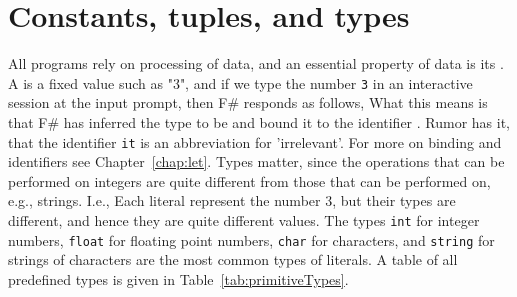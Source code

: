 \chapter{Constants, tuples, and types}
All programs rely on processing of data, and an essential property of data is its . A  is a fixed value such as "3", and if we type the number \lstinline!3! in an interactive session at the input prompt, then F\# responds as follows,
%
%
What this means is that F\# has inferred the type to be  and bound it to the identifier . Rumor has it, that the identifier \lstinline|it| is an abbreviation for 'irrelevant'. For more on binding and identifiers see Chapter~\ref{chap:let}. Types matter, since the operations that can be performed on integers are quite different from those that can be performed on, e.g., strings. I.e.,
%
%
Each literal represent the number 3, but their types are different, and hence they are quite different values. The types \lstinline!int! for integer numbers, \lstinline!float! for floating point numbers, \lstinline!char! for characters, and \lstinline!string! for strings of characters are the most common types of literals. A table of all predefined types is given in Table~\ref{tab:primitiveTypes}.
